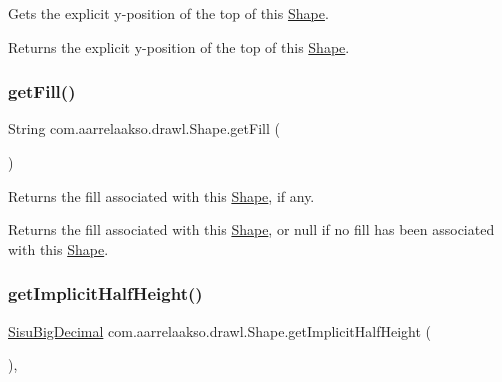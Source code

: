 Gets the explicit y-\/position of the top of this \hyperlink{classcom_1_1aarrelaakso_1_1drawl_1_1_shape}{Shape}.

\begin{DoxyReturn}{Returns}
the explicit y-\/position of the top of this \hyperlink{classcom_1_1aarrelaakso_1_1drawl_1_1_shape}{Shape}. 
\end{DoxyReturn}
\mbox{\label{classcom_1_1aarrelaakso_1_1drawl_1_1_shape_a0d9a33a3e151aaceeec140bea343a650}} 
\subsubsection{\texorpdfstring{get\+Fill()}{getFill()}}
{\footnotesize\ttfamily String com.\+aarrelaakso.\+drawl.\+Shape.\+get\+Fill (\begin{DoxyParamCaption}{ }\end{DoxyParamCaption})\hspace{0.3cm}{\ttfamily [inherited]}}

Returns the fill associated with this \hyperlink{classcom_1_1aarrelaakso_1_1drawl_1_1_shape}{Shape}, if any.

\begin{DoxyReturn}{Returns}
the fill associated with this \hyperlink{classcom_1_1aarrelaakso_1_1drawl_1_1_shape}{Shape}, or null if no fill has been associated with this \hyperlink{classcom_1_1aarrelaakso_1_1drawl_1_1_shape}{Shape}. 
\end{DoxyReturn}
\mbox{\label{classcom_1_1aarrelaakso_1_1drawl_1_1_shape_a33908342a13df06645b6ab7c1fd7a801}} 
\subsubsection{\texorpdfstring{get\+Implicit\+Half\+Height()}{getImplicitHalfHeight()}}
{\footnotesize\ttfamily \hyperlink{classcom_1_1aarrelaakso_1_1drawl_1_1_sisu_big_decimal}{Sisu\+Big\+Decimal} com.\+aarrelaakso.\+drawl.\+Shape.\+get\+Implicit\+Half\+Height (\begin{DoxyParamCaption}{ }\end{DoxyParamCaption})\hspace{0.3cm}{\ttfamily [protected]}, {\ttfamily [inherited]}}

